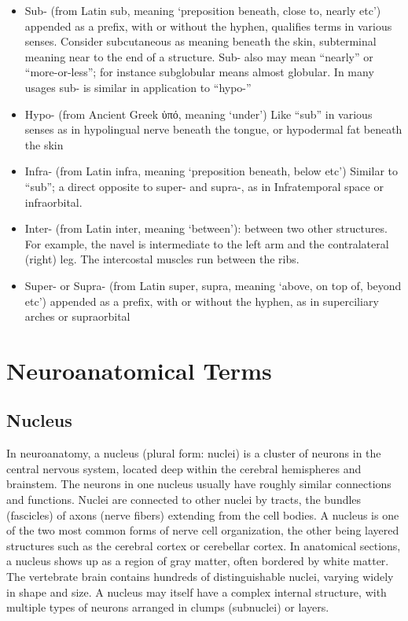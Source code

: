 \begin{itemize}
\tightlist
\item
  Sub- (from Latin sub, meaning `preposition beneath, close to, nearly etc') appended as a prefix, with or without the hyphen, qualifies terms in various senses. Consider subcutaneous as meaning beneath the skin, subterminal meaning near to the end of a structure. Sub- also may mean ``nearly'' or ``more-or-less''; for instance subglobular means almost globular. In many usages sub- is similar in application to ``hypo-''
\item
  Hypo- (from Ancient Greek ὑπό, meaning `under') Like ``sub'' in various senses as in hypolingual nerve beneath the tongue, or hypodermal fat beneath the skin
\item
  Infra- (from Latin infra, meaning `preposition beneath, below etc') Similar to ``sub''; a direct opposite to super- and supra-, as in Infratemporal space or infraorbital.
\item
  Inter- (from Latin inter, meaning `between'): between two other structures. For example, the navel is intermediate to the left arm and the contralateral (right) leg. The intercostal muscles run between the ribs.
\item
  Super- or Supra- (from Latin super, supra, meaning `above, on top of, beyond etc') appended as a prefix, with or without the hyphen, as in superciliary arches or supraorbital
\end{itemize}

\hypertarget{neuroanatomical-terms}{%
\chapter{Neuroanatomical Terms}\label{neuroanatomical-terms}}

\hypertarget{nucleus}{%
\section{Nucleus}\label{nucleus}}

In neuroanatomy, a nucleus (plural form: nuclei) is a cluster of neurons in the central nervous system, located deep within the cerebral hemispheres and brainstem. The neurons in one nucleus usually have roughly similar connections and functions. Nuclei are connected to other nuclei by tracts, the bundles (fascicles) of axons (nerve fibers) extending from the cell bodies. A nucleus is one of the two most common forms of nerve cell organization, the other being layered structures such as the cerebral cortex or cerebellar cortex. In anatomical sections, a nucleus shows up as a region of gray matter, often bordered by white matter. The vertebrate brain contains hundreds of distinguishable nuclei, varying widely in shape and size. A nucleus may itself have a complex internal structure, with multiple types of neurons arranged in clumps (subnuclei) or layers.


